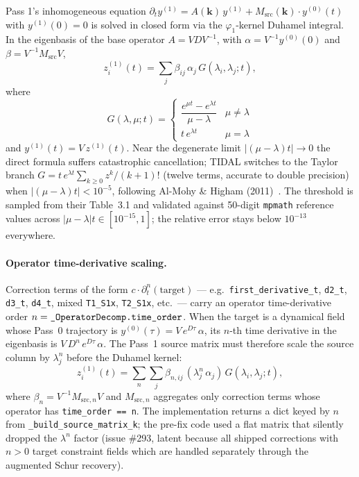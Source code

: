 Pass 1's inhomogeneous equation $\partial_t y^{(1)} = A(\mathbf{k})\, y^{(1)} + M_{\mathrm{src}}(\mathbf{k}) \cdot y^{(0)}(t)$ with $y^{(1)}(0) = 0$ is solved in closed form via the $\varphi_1$-kernel Duhamel integral. In the eigenbasis of the base operator $A = V D V^{-1}$, with $\alpha = V^{-1} y^{(0)}(0)$ and $\beta = V^{-1} M_{\mathrm{src}} V$,
\begin{equation}
  z^{(1)}_i(t) = \sum_j \beta_{ij}\, \alpha_j\, G(\lambda_i, \lambda_j; t),
\end{equation}
where
\begin{equation}
  G(\lambda, \mu; t) = \begin{cases}
    \dfrac{e^{\mu t} - e^{\lambda t}}{\mu - \lambda} & \mu \neq \lambda \\[4pt]
    t\, e^{\lambda t} & \mu = \lambda
  \end{cases}
\end{equation}
and $y^{(1)}(t) = V\, z^{(1)}(t)$. Near the degenerate limit $|(\mu - \lambda) t| \to 0$ the direct formula suffers catastrophic cancellation; TIDAL switches to the Taylor branch $G = t\, e^{\lambda t} \sum_{k \geq 0} z^k / (k+1)!$ (twelve terms, accurate to double precision) when $|(\mu - \lambda) t| < 10^{-5}$, following Al-Mohy \& Higham (2011)~\cite{AlMohyHigham2011}. The threshold is sampled from their Table~3.1 and validated against 50-digit \verb|mpmath| reference values across $|\mu - \lambda| t \in [10^{-15}, 1]$; the relative error stays below $10^{-13}$ everywhere.

\paragraph{Operator time-derivative scaling.} Correction terms of the form $c \cdot \partial_t^n(\text{target})$ --- e.g.\ \verb|first_derivative_t|, \verb|d2_t|, \verb|d3_t|, \verb|d4_t|, mixed \verb|T1_S1x|, \verb|T2_S1x|, etc.\ --- carry an operator time-derivative order $n = \verb|_OperatorDecomp.time_order|$. When the target is a dynamical field whose Pass~0 trajectory is $y^{(0)}(\tau) = V\,e^{D\tau}\,\alpha$, its $n$-th time derivative in the eigenbasis is $V\,D^n\,e^{D\tau}\,\alpha$. The Pass~1 source matrix must therefore scale the source column by $\lambda_j^n$ before the Duhamel kernel:
\begin{equation}
  z^{(1)}_i(t) = \sum_n \sum_j \beta_{n,ij}\, (\lambda_j^n\, \alpha_j)\, G(\lambda_i, \lambda_j; t),
\end{equation}
where $\beta_n = V^{-1} M_{\mathrm{src},n} V$ and $M_{\mathrm{src},n}$ aggregates only correction terms whose operator has \verb|time_order == n|. The implementation returns a dict keyed by $n$ from \verb|_build_source_matrix_k|; the pre-fix code used a flat matrix that silently dropped the $\lambda^n$ factor (issue \#293, latent because all shipped corrections with $n > 0$ target constraint fields which are handled separately through the augmented Schur recovery).

